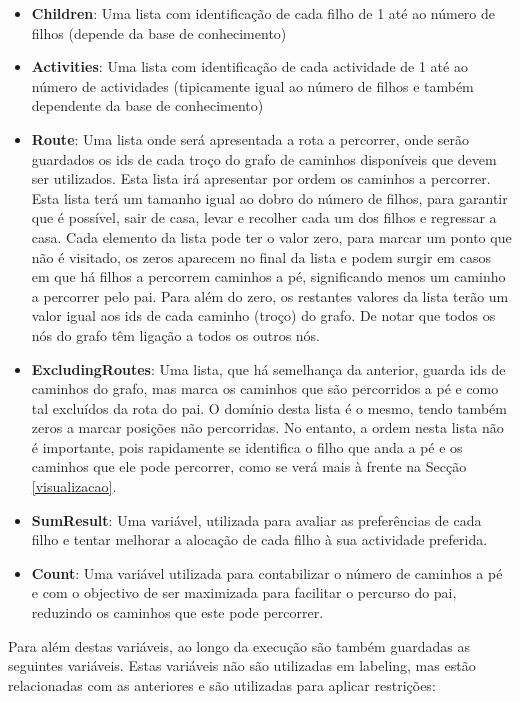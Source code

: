 \documentclass[runningheads]{llncs}
\begin{document}
\begin{itemize}
	\item \textbf{Children}: Uma lista com identificação de cada filho de 1 até ao número de filhos (depende da base de conhecimento)
	\item \textbf{Activities}: Uma lista com identificação de cada actividade de 1 até ao número de actividades (tipicamente igual ao número de filhos e também dependente da base de conhecimento)
	\item \textbf{Route}: Uma lista onde será apresentada a rota a percorrer, onde serão guardados os ids de cada troço do grafo de caminhos disponíveis que devem ser utilizados. Esta lista irá apresentar por ordem os caminhos a percorrer. Esta lista terá um tamanho igual ao dobro do número de filhos, para garantir que é possível, sair de casa, levar e recolher cada um dos filhos e regressar a casa. Cada elemento da lista pode ter o valor zero, para marcar um ponto que não é visitado, os zeros aparecem no final da lista e podem surgir em casos em que há filhos a percorrem caminhos a pé, significando menos um caminho a percorrer pelo pai. Para além do zero, os restantes valores da lista terão um valor igual aos ids de cada caminho (troço) do grafo. De notar que todos os nós do grafo têm ligação a todos os outros nós.
	\item \textbf{ExcludingRoutes}: Uma lista, que há semelhança da anterior, guarda ids de caminhos do grafo, mas marca os caminhos que são percorridos a pé e como tal excluídos da rota do pai. O domínio desta lista é o mesmo, tendo também zeros a marcar posições não percorridas. No entanto, a ordem nesta lista não é importante, pois rapidamente se identifica o filho que anda a pé e os caminhos que ele pode percorrer, como se verá mais à frente na Secção \ref{visualizacao}.
	\item \textbf{SumResult}: Uma variável, utilizada para avaliar as preferências de cada filho e tentar melhorar a alocação de cada filho à sua actividade preferida.
	\item \textbf{Count}: Uma variável utilizada para contabilizar o número de caminhos a pé e com o objectivo de ser maximizada para facilitar o percurso do pai, reduzindo os caminhos que este pode percorrer.
\end{itemize}

Para além destas variáveis, ao longo da execução são também guardadas as seguintes variáveis. Estas variáveis não são utilizadas em labeling, mas estão relacionadas com as anteriores e são utilizadas para aplicar restrições:
\end{document}
